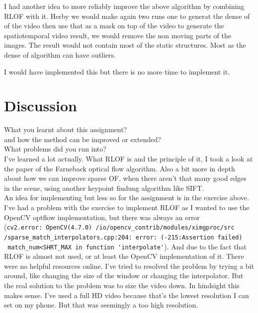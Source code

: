 \documentclass[UTF-8]{article}
\begin{document}
I had another idea to more reliably improve the above algorithm by combining RLOF with it. Herby we would make again two runs one to generat the dense of of the video then use that as a mask on top of the video to generate the spatiotemporal video result, we would remove the non moving parts of the images. The result would not contain most of the static structures. Most as the dense of algorithm can have outliers.

I would have implemented this but there is no more time to implement it.


\newpage
\section*{Discussion}\label{Discussion}
What you learnt about this assignment? \\
and how the method can be improved or extended? \\
What problems did you run into?\\
I've learned a lot actually. What RLOF is and the principle of it, I took a look at the paper of the Farneback optical flow algorithm. Also a bit more in depth about how we can improve sparse OF, when there aren't that many good edges in the scene, using another keypoint findung algorithm like SIFT.\\
An idea for implementing but less so for the assignment is in the exercise above.
\\
I've had a problem with the exercise to implement RLOF as I wanted to use the OpenCV optflow implementation, but there was always an error \\(\verb|cv2.error: OpenCV(4.7.0) /io/opencv_contrib/modules/ximgproc/src|\\\verb|/sparse_match_interpolators.cpp:204: error: (-215:Assertion failed)|\\\verb| match_num<SHRT_MAX in function 'interpolate'|).
And due to the fact that RLOF is almost not used, or at least the OpenCV implementation of it. There were no helpful resources online. I've tried to resolved the problem by trying a bit around, like changing the size of the window or changing the interpolator. But the real solution to the problem was to size the video down. In hindsight this makes sense. I've used a full HD video because that's the lowest resolution I can set on my phone. But that was seemingly a too high resolution. 
\end{document}
